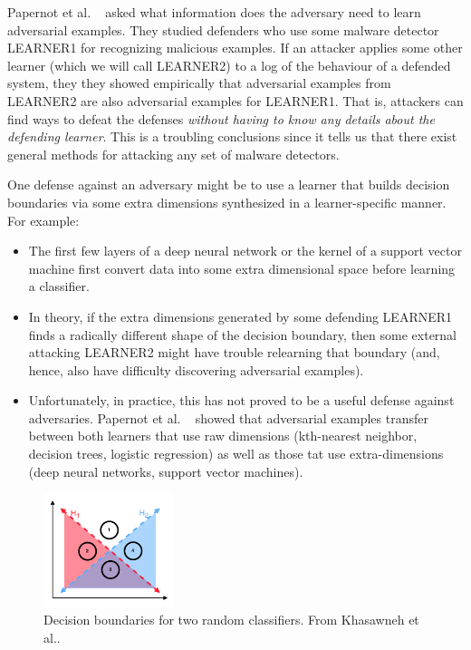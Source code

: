 \documentclass{NSF}
\newenvironment{myitemize}
{ \begin{itemize}[topsep=0pt,bottomsep=0pt,itemsep=0,leftmargin=*]
    \setlength{\itemsep}{0pt}
    \setlength{\parskip}{0pt}
    \setlength{\parsep}{0pt}     }
{ \end{itemize}                  }
\newcommand{\bi}{\begin{myitemize}}
\newcommand{\ei}{\end{myitemize}}
\begin{document}
\begin{nsfdescription}

Papernot et al. ~\cite{papernot2016transferability} asked what information does the adversary need to learn adversarial examples.
They 
  studied defenders who use some malware detector LEARNER1  for recognizing malicious examples. If an attacker
applies some other learner (which we will call LEARNER2) to a log of the behaviour of a defended system,
they they showed empirically that adversarial examples from LEARNER2 are also adversarial examples for LEARNER1.
That is, attackers can find ways to defeat the defenses   {\em without having to know any details about the defending learner}. This is a troubling conclusions since it tells us that there exist general methods for attacking any set of malware detectors.

One defense against an adversary might be to use a learner that builds decision  boundaries via some extra dimensions synthesized
in a learner-specific manner. For example:
\bi
\item
The first few layers of a deep neural network or the kernel of a support vector machine first convert data into some extra dimensional space before learning a classifier. 
\item In theory, if the extra dimensions generated by some defending LEARNER1 finds a radically different shape of the decision boundary, then some external
attacking LEARNER2 might have trouble relearning that boundary 
(and, hence, also have difficulty discovering adversarial examples).
\item
Unfortunately, in practice, this has not proved to be a useful defense against adversaries. Papernot et al. ~\cite{papernot2016transferability} showed
that adversarial examples transfer between both learners that use raw dimensions (kth-nearest neighbor, decision trees, logistic regression) as well
as those tat use extra-dimensions (deep neural networks,   support vector machines).
\ei

 \begin{figure}
\includegraphics[width=1.5in]{fig/kh.png}
\caption{Decision boundaries for two random classifiers. From Khasawneh et al.\cite{khasawneh2017rhmd}.}
\label{fig:kh}
\end{figure}


\end{nsfdescription}
\end{document}
